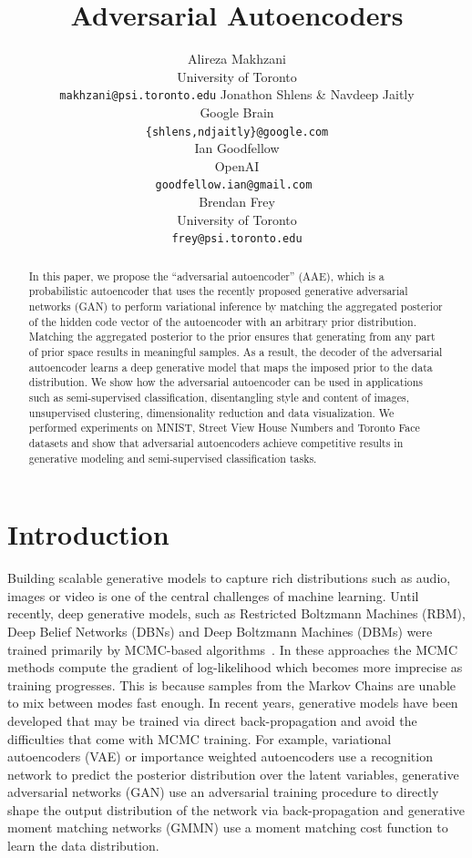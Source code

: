 \documentclass{article}
\title{Adversarial Autoencoders}
\author{
Alireza Makhzani\\
University of Toronto\\
\texttt{makhzani@psi.toronto.edu}
\And
Jonathon Shlens \& Navdeep Jaitly \\
Google Brain \\
\texttt{\{shlens,ndjaitly\}@google.com} \\
\And
Ian Goodfellow \\
OpenAI \\
\texttt{goodfellow.ian@gmail.com } \\
\And
Brendan Frey\\
University of Toronto\\
\texttt{frey@psi.toronto.edu}
}
\begin{document}

\maketitle
\begin{abstract}
In this paper, we propose the ``adversarial autoencoder'' (AAE), which is a probabilistic autoencoder that uses the recently proposed generative adversarial networks (GAN) to perform variational inference by matching the aggregated posterior of the hidden code vector of the autoencoder with an arbitrary prior distribution. Matching the aggregated posterior to the prior ensures that generating from any part of prior space results in meaningful samples.  As a result, the decoder of the adversarial autoencoder learns a deep generative model that maps the imposed prior to the data distribution. We show how the adversarial autoencoder can be used in applications such as semi-supervised classification, disentangling style and content of images, unsupervised clustering, dimensionality reduction and data visualization. We performed experiments on MNIST, Street View House Numbers and Toronto Face datasets and show that adversarial autoencoders achieve competitive results in generative modeling and semi-supervised classification tasks.
\end{abstract}

\section{Introduction}
Building scalable generative models to capture rich distributions such as audio, images or video is one of the central challenges of machine learning.
Until recently, deep generative models, such as Restricted Boltzmann Machines (RBM), Deep Belief Networks (DBNs) and Deep Boltzmann Machines (DBMs) were
trained primarily by MCMC-based algorithms~\citep{geoff,russ}.
In these approaches the MCMC methods compute the gradient of log-likelihood which becomes more imprecise as training progresses. This is because
samples from the Markov Chains are unable to mix between modes fast enough.  In recent years, generative models have been developed that may be
trained via direct back-propagation and avoid the difficulties that come with MCMC training.
For example, variational autoencoders (VAE) \citep{vae,rezende} or importance weighted autoencoders \citep{yuri} use a recognition network to predict the posterior distribution over the latent variables, generative adversarial networks (GAN) \citep{gan} use an adversarial training procedure to directly shape the output distribution of the network via back-propagation and generative moment matching networks (GMMN) \citep{gmmn} use a moment matching cost function to learn the data distribution.
\end{document}
